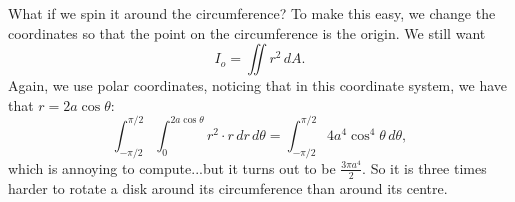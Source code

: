 What if we spin it around the circumference? To make this easy, we change the coordinates so that the point on the circumference is the origin. We still want
\[ I_o = \iint r^2\,dA. \]
Again, we use polar coordinates, noticing that in this coordinate system, we have that $r = 2a\cos \theta$:
\[ \int_{-\pi/2}^{\pi/2} \int_0^{2a\cos\theta} r^2\cdot r\,dr\,d\theta = \int_{-\pi/2}^{\pi/2} 4a^4\cos^4\theta\,d\theta, \]
which is annoying to compute...but it turns out to be $\frac {3\pi a^4}2$. So it is three times harder to rotate a disk around its circumference than around its centre.
\eex
\eit
